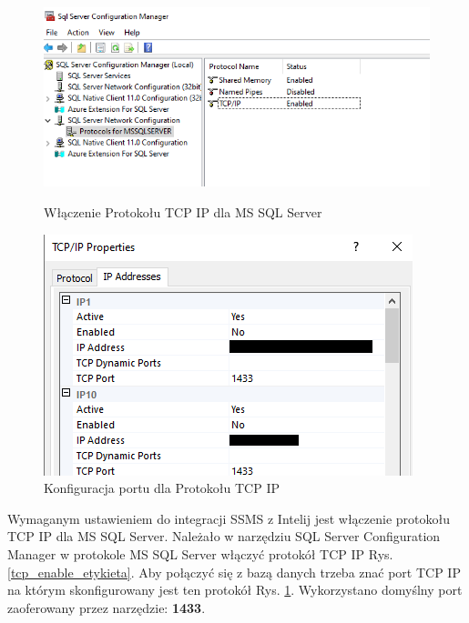 \begin{figure}[ht]
  \begin{minipage}[b]{0.6\linewidth}
    \includegraphics[width=\linewidth]{rys05/enable_tcpip.png}
    \caption{Włączenie Protokołu TCP IP dla MS SQL Server}
		\label{tcp_enable_etykieta}
  \end{minipage}
  \begin{minipage}[b]{0.5\linewidth}
    \includegraphics[width=\linewidth]{rys05/port_tcpip.png}
    \caption{Konfiguracja portu dla Protokołu TCP IP}
		\label{tcp_conf_etykieta}
  \end{minipage}
\end{figure}


Wymaganym ustawieniem do integracji SSMS z Intelij jest włączenie protokołu TCP IP dla MS SQL Server. Należało w narzędziu SQL Server Configuration Manager w protokole MS SQL Server włączyć protokół TCP IP Rys. \ref {tcp_enable_etykieta}.
Aby połączyć się z bazą danych trzeba znać port TCP IP na którym skonfigurowany jest ten protokół Rys. \ref{tcp_conf_etykieta}. Wykorzystano domyślny port zaoferowany przez narzędzie: \textbf{1433}.

